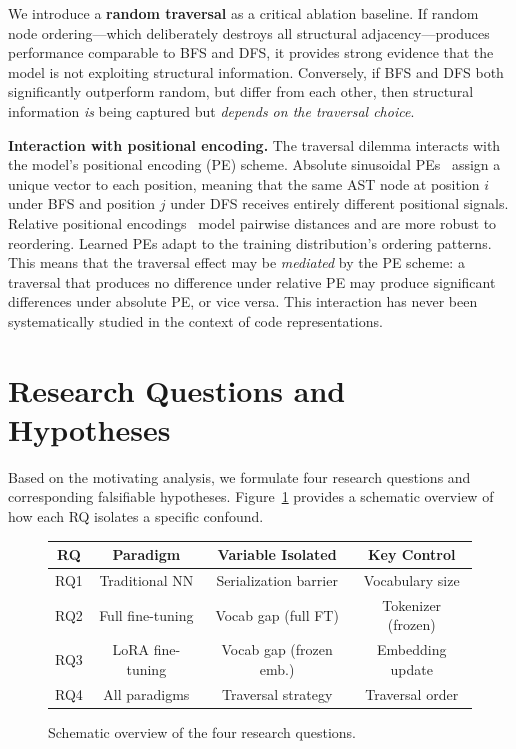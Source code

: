 \documentclass[pdflatex,sn-mathphys,Numbered]{sn-jnl}
\begin{document}
We introduce a \textbf{random traversal} as a critical ablation baseline. If random node ordering---which deliberately destroys all structural adjacency---produces performance comparable to BFS and DFS, it provides strong evidence that the model is not exploiting structural information. Conversely, if BFS and DFS both significantly outperform random, but differ from each other, then structural information \emph{is} being captured but \emph{depends on the traversal choice}.

\textbf{Interaction with positional encoding.} The traversal dilemma interacts with the model's positional encoding (PE) scheme. Absolute sinusoidal PEs~\citep{vaswani2017attention} assign a unique vector to each position, meaning that the same AST node at position $i$ under BFS and position $j$ under DFS receives entirely different positional signals. Relative positional encodings~\citep{shaw2018relpos} model pairwise distances and are more robust to reordering. Learned PEs adapt to the training distribution's ordering patterns. This means that the traversal effect may be \emph{mediated} by the PE scheme: a traversal that produces no difference under relative PE may produce significant differences under absolute PE, or vice versa. This interaction has never been systematically studied in the context of code representations.

\section{Research Questions and Hypotheses}\label{sec:rq}

Based on the motivating analysis, we formulate four research questions and corresponding falsifiable hypotheses. Figure~\ref{fig:rq-overview} provides a schematic overview of how each RQ isolates a specific confound.

\begin{figure}[tb]
\centering
\begin{tabular}{c|c|c|c}
\toprule
\textbf{RQ} & \textbf{Paradigm} & \textbf{Variable Isolated} & \textbf{Key Control} \\
\midrule
RQ1 & Traditional NN & Serialization barrier & Vocabulary size \\
RQ2 & Full fine-tuning & Vocab gap (full FT) & Tokenizer (frozen) \\
RQ3 & LoRA fine-tuning & Vocab gap (frozen emb.) & Embedding update \\
RQ4 & All paradigms & Traversal strategy & Traversal order \\
\bottomrule
\end{tabular}
\caption{Schematic overview of the four research questions.}\label{fig:rq-overview}
\end{figure}
\end{document}
